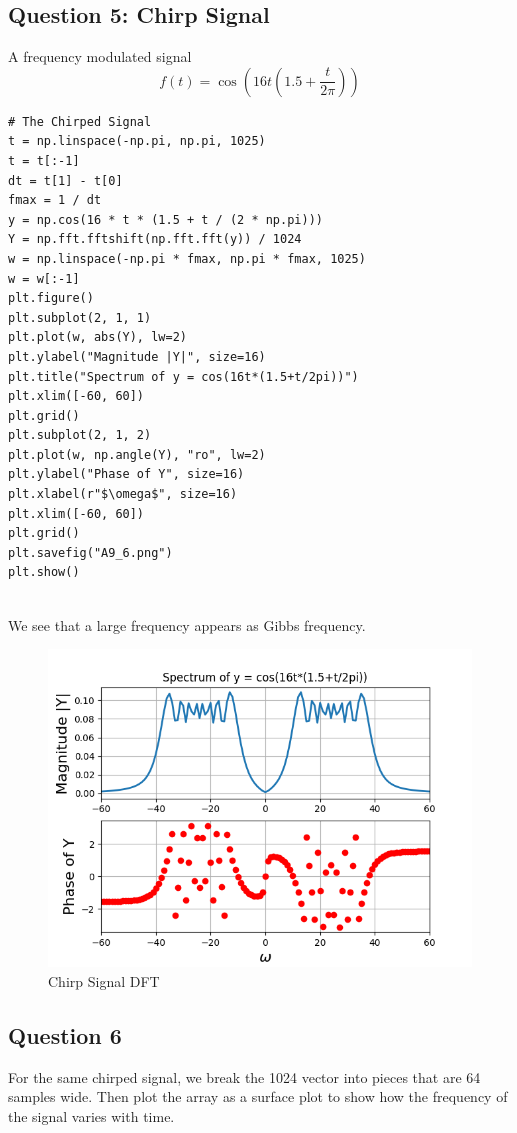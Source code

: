 \documentclass[11pt, a4paper]{article}
\begin{document}
\subsection{Question 5: Chirp Signal}
A frequency modulated signal
$$f(t)=\cos(16t(1.5+\frac{t}{2\pi}))$$

\begin{verbatim}
# The Chirped Signal
t = np.linspace(-np.pi, np.pi, 1025)
t = t[:-1]
dt = t[1] - t[0]
fmax = 1 / dt
y = np.cos(16 * t * (1.5 + t / (2 * np.pi)))
Y = np.fft.fftshift(np.fft.fft(y)) / 1024
w = np.linspace(-np.pi * fmax, np.pi * fmax, 1025)
w = w[:-1]
plt.figure()
plt.subplot(2, 1, 1)
plt.plot(w, abs(Y), lw=2)
plt.ylabel("Magnitude |Y|", size=16)
plt.title("Spectrum of y = cos(16t*(1.5+t/2pi))")
plt.xlim([-60, 60])
plt.grid()
plt.subplot(2, 1, 2)
plt.plot(w, np.angle(Y), "ro", lw=2)
plt.ylabel("Phase of Y", size=16)
plt.xlabel(r"$\omega$", size=16)
plt.xlim([-60, 60])
plt.grid()
plt.savefig("A9_6.png")
plt.show()


\end{verbatim}

We see that a large frequency appears as Gibbs frequency.
\begin{figure}[!tbh]
   	\centering
  \includegraphics[scale=0.5]{A9_6.png} 
    \caption{Chirp Signal DFT} 	
   \end{figure}  
   
\subsection{Question 6}
For the same chirped signal, we break the 1024 vector into pieces that are 64 samples wide. Then plot the array as a surface plot to show how the frequency of the signal varies with time.
\end{document}
